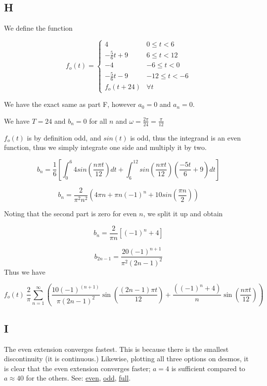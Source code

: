 \documentclass{article}
\begin{document}
\subsection*{H}

We define the function

\[ f_o(t) = \begin{cases}
      4 & 0\leq t < 6 \\
      -\frac{5}{6}t+9 & 6\leq t < 12 \\
      -4 & -6\leq t < 0 \\
      -\frac{5}{6}t-9 & -12 \leq t < -6 \\
      f_o(t + 24) & \forall t
   \end{cases}
\]  

We have the exact same as part F, however $a_0=0$ and $a_n=0$.

We have $T=24$ and $b_n=0$ for all $n$ and $\omega = \frac{2\pi}{24} = \frac{\pi}{12}$

$f_o(t)$ is by definition odd, and $sin(t)$ is odd, thus the integrand is an even function, thus we simply integrate one side and multiply it by two.

$$
b_n = \frac{1}{6} \left[ \int_0^{6} 4 sin\left( \frac{n \pi t}{12} \right) dt + \int_6^{12} sin\left(\frac{n \pi t}{12}\right)\left(\frac{-5t}{6}+9\right)dt\right]
$$

$$
b_n = \frac{2}{\pi^2n^2} \left( 4\pi n + \pi n \left(-1\right)^n + 10sin\left(\frac{\pi n}{2}\right)\right)
$$

Noting that the second part is zero for even $n$, we split it up and obtain

$$
b_n = \frac{2}{\pi n} \left[\left(-1\right)^n+4\right]
$$

$$
b_{2n-1} = \frac{20\left(-1\right)^{n+1}}{\pi^2\left(2n-1\right)^2}
$$
Thus we have

$$
f_o(t) ~ \frac{2}{\pi}\sum_{n=1}^{\infty}\left(\frac{10\left(-1\right)^{\left(n+1\right)}}{\pi\left(2n-1\right)^{2}}\sin\left(\frac{\left(2n-1\right)\pi t}{12}\right)+\frac{\left(\left(-1\right)^{n}+4\right)}{n}\sin\left(\frac{n\pi t}{12}\right)\right)
$$


\subsection*{I}

The even extension converges fastest.  This is because there is the smallest discontinuity (it is continuous.)
Likewise, plotting all three options on desmos, it is clear that the even extension converges faster; $a=4$ is sufficient compared to $a \approx 40$ for the others.
See: \href{https://www.desmos.com/calculator/5vbrrqod2w}{even}, \href{https://www.desmos.com/calculator/dizmwfhtt9}{odd}, \href{https://www.desmos.com/calculator/glyqzp3gbf}{full}.
\end{document}
